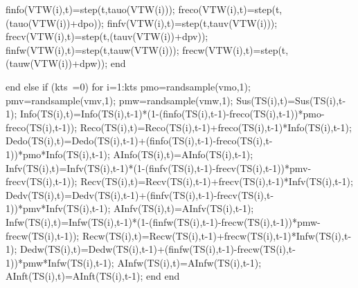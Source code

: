                                           finfo(VTW(i),t)=step(t,tauo(VTW(i))); %
                                          freco(VTW(i),t)=step(t,(tauo(VTW(i))+dpo)); %
                                          finfv(VTW(i),t)=step(t,tauv(VTW(i))); %
                                          frecv(VTW(i),t)=step(t,(tauv(VTW(i))+dpv)); %
                                          finfw(VTW(i),t)=step(t,tauw(VTW(i))); %
                                          frecw(VTW(i),t)=step(t,(tauw(VTW(i))+dpw)); %
                                    end
                                    
                               end
                          else
                                  if (kts~=0)
                                      for i=1:kts 
                                            pmo=randsample(vmo,1);
                                            pmv=randsample(vmv,1);
                                            pmw=randsample(vmw,1);
                                            Sus(TS(i),t)=Sus(TS(i),t-1);
                                            Info(TS(i),t)=Info(TS(i),t-1)*(1-(finfo(TS(i),t-1)-freco(TS(i),t-1))*pmo-freco(TS(i),t-1));
                                            Reco(TS(i),t)=Reco(TS(i),t-1)+freco(TS(i),t-1)*Info(TS(i),t-1);
                                            Dedo(TS(i),t)=Dedo(TS(i),t-1)+(finfo(TS(i),t-1)-freco(TS(i),t-1))*pmo*Info(TS(i),t-1);
                                            AInfo(TS(i),t)=AInfo(TS(i),t-1);
                                            Infv(TS(i),t)=Infv(TS(i),t-1)*(1-(finfv(TS(i),t-1)-frecv(TS(i),t-1))*pmv-frecv(TS(i),t-1));
                                            Recv(TS(i),t)=Recv(TS(i),t-1)+frecv(TS(i),t-1)*Infv(TS(i),t-1);
                                            Dedv(TS(i),t)=Dedv(TS(i),t-1)+(finfv(TS(i),t-1)-frecv(TS(i),t-1))*pmv*Infv(TS(i),t-1);
                                            AInfv(TS(i),t)=AInfv(TS(i),t-1); 
                                            Infw(TS(i),t)=Infw(TS(i),t-1)*(1-(finfw(TS(i),t-1)-frecw(TS(i),t-1))*pmw-frecw(TS(i),t-1));
                                            Recw(TS(i),t)=Recw(TS(i),t-1)+frecw(TS(i),t-1)*Infw(TS(i),t-1);
                                            Dedw(TS(i),t)=Dedw(TS(i),t-1)+(finfw(TS(i),t-1)-frecw(TS(i),t-1))*pmw*Infw(TS(i),t-1);
                                            AInfw(TS(i),t)=AInfw(TS(i),t-1);   
                                            AInft(TS(i),t)=AInft(TS(i),t-1);                    
                                      end
                                  end  
                                    
